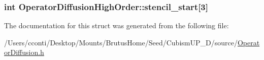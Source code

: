 \subsubsection[{stencil\+\_\+start}]{\setlength{\rightskip}{0pt plus 5cm}int Operator\+Diffusion\+High\+Order\+::stencil\+\_\+start\mbox{[}3\mbox{]}}\label{struct_operator_diffusion_high_order_a24900868ca9406abe8e5c1354c4491b9}


The documentation for this struct was generated from the following file\+:\begin{DoxyCompactItemize}
\item 
/\+Users/cconti/\+Desktop/\+Mounts/\+Brutus\+Home/\+Seed/\+Cubism\+U\+P\+\_\+D/source/\hyperlink{_operator_diffusion_8h}{Operator\+Diffusion.\+h}\end{DoxyCompactItemize}
